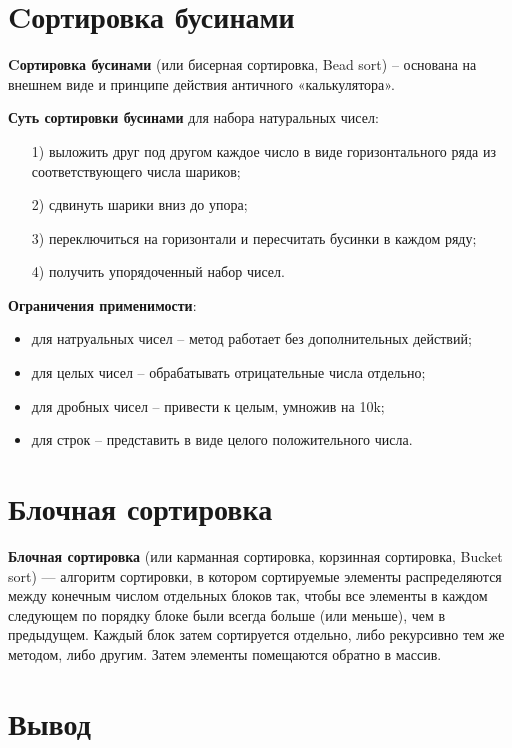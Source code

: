 \documentclass[a4paper,14pt, unknownkeysallowed]{extreport}
\begin{document}
\section{Cортировка бусинами}

\textbf{Cортировка бусинами} (или бисерная сортировка, Bead sort) -- основана на внешнем виде и принципе действия античного «калькулятора».

\textbf{Суть сортировки бусинами} для набора натуральных чисел:

\begin{enumerate}
	\item[1)] выложить друг под другом каждое число в виде горизонтального ряда из соответствующего числа шариков;
	\item[2)] сдвинуть шарики вниз до упора;
	\item[3)] переключиться на горизонтали и пересчитать бусинки в каждом ряду;
	\item[4)] получить упорядоченный набор чисел.
\end{enumerate}

\textbf{Ограничения применимости}: 

\begin{itemize}
    \item для натруальных чисел -- метод работает без дополнительных действий;
    \item для целых чисел -- обрабатывать отрицательные числа отдельно;
    \item для дробных чисел -- привести к целым, умножив на 10k;
    \item для строк -- представить в виде целого положительного числа.
\end{itemize}
	
\section{Блочная сортировка}

\textbf{Блочная сортировка} (или карманная сортировка, корзинная сортировка, Bucket sort) — алгоритм сортировки, в котором сортируемые элементы распределяются между конечным числом отдельных блоков так, чтобы все элементы в каждом следующем по порядку блоке были всегда больше (или меньше), чем в предыдущем. Каждый блок затем сортируется отдельно, либо рекурсивно тем же методом, либо другим. Затем элементы помещаются обратно в массив.
	
\section*{Вывод}
	
\end{document}
